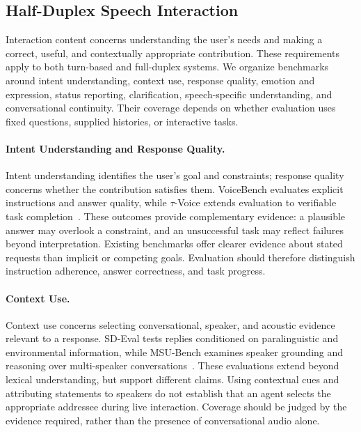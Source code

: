 
\subsection{Half-Duplex Speech Interaction}
\label{sec:half-duplex-datasets}

Interaction content concerns understanding the user's needs and making a correct, useful, and contextually appropriate contribution. These requirements apply to both turn-based and full-duplex systems. We organize benchmarks around intent understanding, context use, response quality, emotion and expression, status reporting, clarification, speech-specific understanding, and conversational continuity. Their coverage depends on whether evaluation uses fixed questions, supplied histories, or interactive tasks.

\paragraph{Intent Understanding and Response Quality.}
\label{sec:61halfduplex-intent-response}
Intent understanding identifies the user's goal and constraints; response quality concerns whether the contribution satisfies them. VoiceBench evaluates explicit instructions and answer quality, while $\tau$-Voice extends evaluation to verifiable task completion~\citep{61halfduplex-voicebench,61halfduplex-tauvoice}. These outcomes provide complementary evidence: a plausible answer may overlook a constraint, and an unsuccessful task may reflect failures beyond interpretation. Existing benchmarks offer clearer evidence about stated requests than implicit or competing goals. Evaluation should therefore distinguish instruction adherence, answer correctness, and task progress.

\paragraph{Context Use.}
\label{sec:61halfduplex-context}
Context use concerns selecting conversational, speaker, and acoustic evidence relevant to a response. SD-Eval tests replies conditioned on paralinguistic and environmental information, while MSU-Bench examines speaker grounding and reasoning over multi-speaker conversations~\citep{61halfduplex-sdeval,61halfduplex-msubench}. These evaluations extend beyond lexical understanding, but support different claims. Using contextual cues and attributing statements to speakers do not establish that an agent selects the appropriate addressee during live interaction. Coverage should be judged by the evidence required, rather than the presence of conversational audio alone.

